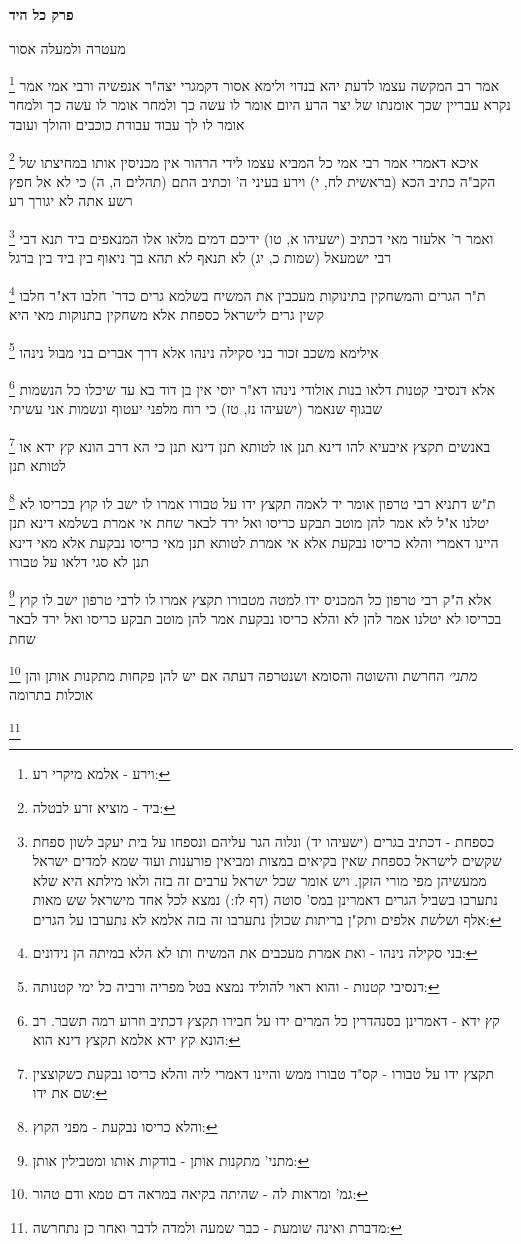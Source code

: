 \documentclass[12pt, openany]{book}
\newcommand{\sethebfont}{
\fontsize{10.5pt}{21.0pt} \selectfont
}
\newcommand{\twocol}[1]{
	{\sethebfont \begin{multicols}{2}
			#1
	\end{multicols}}	
}
\newcommand{\chapname}{}
\newcommand{\newchap}[1]{
	\addcontentsline{toc}{chapter}{#1}
	\renewcommand{\chapname}{#1}
		\begin{center}
			\textbf{%
\fontsize{16pt}{16pt}\selectfont
				#1}
		\end{center}
}
\newcommand{\footnotecomment}[1]{
	\renewcommand\thefootnote{}
	\footnote{#1}}
\newcommand{\commenta}[1]{\footnotecomment{#1}}
\begin{document}
\newchap{פרק  כל היד}
\twocol{מעטרה ולמעלה אסור 
\commenta{וירע - אלמא מיקרי רע:}
אמר רב המקשה עצמו לדעת יהא בנדוי ולימא אסור דקמגרי יצה"ר אנפשיה ורבי אמי אמר נקרא עבריין שכך אומנתו של יצר הרע היום אומר לו עשה כך ולמחר אומר לו עשה כך ולמחר אומר לו לך עבוד עבודת כוכבים והולך ועובד 
\commenta{ביד - מוציא זרע לבטלה:}
איכא דאמרי אמר רבי אמי כל המביא עצמו לידי הרהור אין מכניסין אותו במחיצתו של הקב"ה כתיב הכא (בראשית לח, י) וירע בעיני ה' וכתיב התם (תהלים ה, ה) כי לא אל חפץ רשע אתה לא יגורך רע 
\commenta{כספחת - דכתיב בגרים (ישעיהו יד) ונלוה הגר עליהם ונספחו על בית יעקב לשון ספחת שקשים לישראל כספחת שאין בקיאים במצות ומביאין פורענות ועוד שמא למדים ישראל ממעשיהן מפי מורי הזקן. ויש אומר שכל ישראל ערבים זה בזה ולאו מילתא היא שלא נתערבו בשביל הגרים דאמרינן במס' סוטה (דף לז:) נמצא לכל אחד מישראל שש מאות אלף ושלשת אלפים ותק"ן בריתות שכולן נתערבו זה בזה אלמא לא נתערבו על הגרים:}
ואמר ר' אלעזר מאי דכתיב (ישעיהו א, טו) ידיכם דמים מלאו אלו המנאפים ביד תנא דבי רבי ישמעאל (שמות כ, יג) לא תנאף לא תהא בך ניאוף בין ביד בין ברגל 
\commenta{בני סקילה נינהו - ואת אמרת מעכבים את המשיח ותו לא הלא במיתה הן נידונים:}
ת"ר הגרים והמשחקין בתינוקות מעכבין את המשיח בשלמא גרים כדר' חלבו דא"ר חלבו קשין גרים לישראל כספחת אלא משחקין בתנוקות מאי היא 
\commenta{דנסיבי קטנות - והוא ראוי להוליד נמצא בטל מפריה ורביה כל ימי קטנותה:}
אילימא משכב זכור בני סקילה נינהו אלא דרך אברים בני מבול נינהו 
\commenta{קץ ידא - דאמרינן בסנהדרין כל המרים ידו על חבירו תקצץ דכתיב וזרוע רמה תשבר. רב הונא קץ ידא אלמא תקצץ דינא הוא:}
אלא דנסיבי קטנות דלאו בנות אולודי נינהו דא"ר יוסי אין בן דוד בא עד שיכלו כל הנשמות שבגוף שנאמר (ישעיהו נז, טז) כי רוח מלפני יעטוף ונשמות אני עשיתי
\commenta{תקצץ ידו על טבורו - קס"ד טבורו ממש והיינו דאמרי ליה והלא כריסו נבקעת כשקוצצין שם את ידו:}
באנשים תקצץ איבעיא להו דינא תנן או לטותא תנן דינא תנן כי הא דרב הונא קץ ידא או לטותא תנן 
\commenta{והלא כריסו נבקעת - מפני הקוץ:}
ת"ש דתניא רבי טרפון אומר יד לאמה תקצץ ידו על טבורו אמרו לו ישב לו קוץ בכריסו לא יטלנו א"ל לא אמר להן מוטב תבקע כריסו ואל ירד לבאר שחת 
אי אמרת בשלמא דינא תנן היינו דאמרי והלא כריסו נבקעת אלא אי אמרת לטותא תנן מאי כריסו נבקעת אלא מאי דינא תנן לא סגי דלאו על טבורו 
\commenta{מתני' מתקנות אותן - בודקות אותו ומטבילין אותן:}
אלא ה"ק רבי טרפון כל המכניס ידו למטה מטבורו תקצץ אמרו לו לרבי טרפון ישב לו קוץ בכריסו לא יטלנו אמר להן לא והלא כריסו נבקעת אמר להן מוטב תבקע כריסו ואל ירד לבאר שחת
\commenta{גמ' ומראות לה - שהיתה בקיאה במראה דם טמא ודם טהור:}
{\large\emph{מתני׳}} החרשת והשוטה והסומא ושנטרפה דעתה אם יש להן פקחות מתקנות אותן והן אוכלות בתרומה
\commenta{מדברת ואינה שומעת - כבר שמעה ולמדה לדבר ואחר כן נתחרשה:}
}
\end{document}
